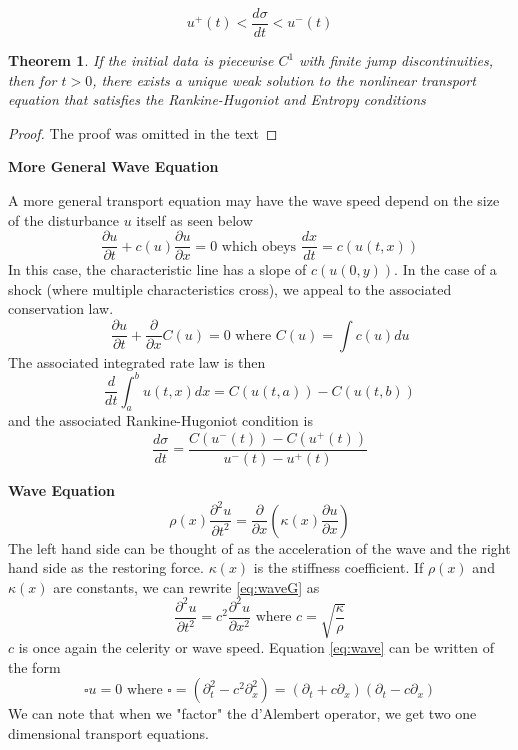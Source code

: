 \documentclass{article}
\newcommand{\pd}[2]{\frac{\partial #1}{\partial #2}}
\newcommand{\od}[2]{\frac{d #1}{d #2}}
\newcommand{\pdt}[2]{\frac{\partial ^2 #1}{\partial #2 ^2}}
\newtheorem{theorem}{Theorem}[section]
\numberwithin{equation}{section}
\begin{document}
\begin{equation*}
    u^+(t)<\od{\sigma}{t}<u^-(t)
\end{equation*}
\begin{theorem}
    If the initial data is piecewise $C^1$ with finite jump discontinuities, then for $t>0$, there exists a unique weak solution to the nonlinear transport equation that satisfies the Rankine-Hugoniot and Entropy conditions
\end{theorem}
\begin{proof}
    The proof was omitted in the text
\end{proof}



\textbf{More General Wave Equation}

A more general transport equation may have the wave speed depend on the size of the disturbance $u$ itself as seen below
\begin{equation*}
    \pd{u}{t}+c(u)\pd{u}{x} = 0 \text{ which obeys } \od{x}{t} = c(u(t,x))
\end{equation*}
In this case, the characteristic line has a slope of $c(u(0,y))$. In the case of a shock (where multiple characteristics cross), we appeal to the associated conservation law.
\begin{equation*}
    \pd{u}{t} + \frac{\partial}{\partial x}C(u) = 0 \text{ where } C(u) = \int c(u)du
\end{equation*}
The associated integrated rate law is then 
\begin{equation*}
    \frac{d}{dt}\int^b_au(t,x)dx = C(u(t,a))-C(u(t,b))
\end{equation*}
and the associated Rankine-Hugoniot condition is 
\begin{equation*}
    \od{\sigma}{t} = \frac{C(u^-(t)) - C(u^+(t))}{u^-(t)-u^+(t)}
\end{equation*}

\textbf{Wave Equation}\\
\begin{equation}
    \rho(x) \pdt{u}{t} = \frac{\partial}{\partial x} \left( \kappa(x)\pd{u}{x} \right) \label{eq:waveG}
\end{equation}
The left hand side can be thought of as the acceleration of the wave and the right hand side as the restoring force. $\kappa(x)$ is the stiffness coefficient. If $\rho(x)$ and $\kappa(x)$ are constants, we can rewrite \eqref{eq:waveG} as 
\begin{equation}
    \pdt{u}{t} = c^2\pdt{u}{x} \text{ where } c=\sqrt{\frac{\kappa}{\rho}} \label{eq:wave}
\end{equation}
$c$ is once again the celerity or wave speed. Equation \eqref{eq:wave} can be written of the form 
\begin{equation*}
    \square u = 0 \text{ where } \square=(\partial^2_t - c^2\partial^2_x) = (\partial_t+c\partial_x)(\partial_t-c\partial_x)
\end{equation*}
We can note that when we "factor" the d'Alembert operator, we get two one dimensional transport equations.
\end{document}
